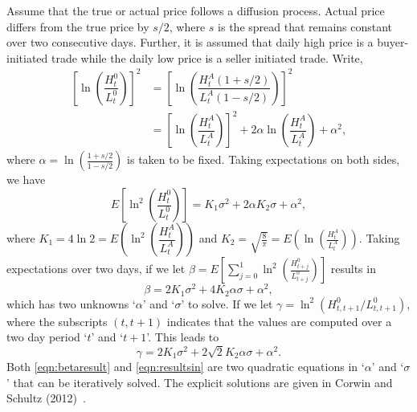Assume that the true or actual price follows a diffusion process. Actual price differs from the true price by $s/2$, where $s$ is the spread that remains constant over two consecutive days. Further, it is assumed that daily high price is a buyer-initiated trade while the daily low price is a seller initiated trade. Write,
	\begin{equation} \label{eqn:sellertrade}
	\begin{split}
	\left[ \ln \left( \dfrac{H_t^0}{L_t^0} \right) \right]^2&= \left[ \ln \left( \dfrac{H_t^A(1+s/2)}{L_t^A(1-s/2)} \right) \right]^2 \\
	&=\left[ \ln \left( \dfrac{H_t^A}{L_t^A} \right) \right]^2 + 2 \alpha \ln\left( \dfrac{H_t^A}{L_t^A} \right) + \alpha^2,
	\end{split}
	\end{equation}
where $\alpha=\ln\left( \frac{1+s/2}{1-s/2} \right)$ is taken to be fixed. Taking expectations on both sides, we have
	\begin{equation} \label{eqn:expsides}
	E\left[ \ln^2 \left( \dfrac{H_t^0}{L_t^0} \right) \right]= K_1\sigma^2 + 2\alpha K_2 \sigma + \alpha^2,
	\end{equation}
where $K_1= 4\ln 2= E\left( \ln^2 \left( \dfrac{H_t^A}{L_t^A} \right) \right)$ and $K_2= \sqrt{\frac{8}{\pi}}= E\left( \ln\left(\frac{H_t^A}{L_t^A} \right) \right)$. Taking expectations over two days, if we let $\beta= E\left[ \sum_{j=0}^1 \ln^2 \left( \frac{H_{t+j}^0}{L_{t+j}^0} \right) \right]$ results in 
	\begin{equation} \label{eqn:betaresult}
	\beta= 2K_1 \sigma^2 + 4K_2 \alpha \sigma + \alpha^2,
	\end{equation}
which has two unknowns `$\alpha$' and `$\sigma$' to solve. If we let $\gamma= \ln^2(H_{t,t+1}^0/L_{t,t+1}^0)$, where the subscripts $(t,t+1)$ indicates that the values are computed over a two day period `$t$' and `$t+1$'. This leads to
	\begin{equation} \label{eqn:resultsin}
	\gamma= 2K_1\sigma^2 + 2\sqrt{2} K_2\alpha \sigma + \alpha^2.
	\end{equation}
Both \eqref{eqn:betaresult} and \eqref{eqn:resultsin} are two quadratic equations in `$\alpha$' and `$\sigma$' that can be iteratively solved. The explicit solutions are given in Corwin and Schultz (2012)~\cite{schultz12}.


